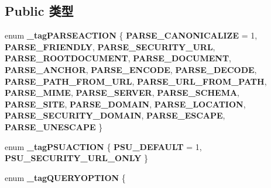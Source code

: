 \subsection*{Public 类型}
\begin{DoxyCompactItemize}
\item 
\mbox{\label{interface_i_internet_protocol_info_a3e2540984d5743ca6453922a83fffb62}} 
enum {\bfseries \+\_\+tag\+P\+A\+R\+S\+E\+A\+C\+T\+I\+ON} \{ \newline
{\bfseries P\+A\+R\+S\+E\+\_\+\+C\+A\+N\+O\+N\+I\+C\+A\+L\+I\+ZE} = 1, 
{\bfseries P\+A\+R\+S\+E\+\_\+\+F\+R\+I\+E\+N\+D\+LY}, 
{\bfseries P\+A\+R\+S\+E\+\_\+\+S\+E\+C\+U\+R\+I\+T\+Y\+\_\+\+U\+RL}, 
{\bfseries P\+A\+R\+S\+E\+\_\+\+R\+O\+O\+T\+D\+O\+C\+U\+M\+E\+NT}, 
\newline
{\bfseries P\+A\+R\+S\+E\+\_\+\+D\+O\+C\+U\+M\+E\+NT}, 
{\bfseries P\+A\+R\+S\+E\+\_\+\+A\+N\+C\+H\+OR}, 
{\bfseries P\+A\+R\+S\+E\+\_\+\+E\+N\+C\+O\+DE}, 
{\bfseries P\+A\+R\+S\+E\+\_\+\+D\+E\+C\+O\+DE}, 
\newline
{\bfseries P\+A\+R\+S\+E\+\_\+\+P\+A\+T\+H\+\_\+\+F\+R\+O\+M\+\_\+\+U\+RL}, 
{\bfseries P\+A\+R\+S\+E\+\_\+\+U\+R\+L\+\_\+\+F\+R\+O\+M\+\_\+\+P\+A\+TH}, 
{\bfseries P\+A\+R\+S\+E\+\_\+\+M\+I\+ME}, 
{\bfseries P\+A\+R\+S\+E\+\_\+\+S\+E\+R\+V\+ER}, 
\newline
{\bfseries P\+A\+R\+S\+E\+\_\+\+S\+C\+H\+E\+MA}, 
{\bfseries P\+A\+R\+S\+E\+\_\+\+S\+I\+TE}, 
{\bfseries P\+A\+R\+S\+E\+\_\+\+D\+O\+M\+A\+IN}, 
{\bfseries P\+A\+R\+S\+E\+\_\+\+L\+O\+C\+A\+T\+I\+ON}, 
\newline
{\bfseries P\+A\+R\+S\+E\+\_\+\+S\+E\+C\+U\+R\+I\+T\+Y\+\_\+\+D\+O\+M\+A\+IN}, 
{\bfseries P\+A\+R\+S\+E\+\_\+\+E\+S\+C\+A\+PE}, 
{\bfseries P\+A\+R\+S\+E\+\_\+\+U\+N\+E\+S\+C\+A\+PE}
 \}
\item 
\mbox{\label{interface_i_internet_protocol_info_a9ba7919b01c2c81c8aae87d78623bf45}} 
enum {\bfseries \+\_\+tag\+P\+S\+U\+A\+C\+T\+I\+ON} \{ {\bfseries P\+S\+U\+\_\+\+D\+E\+F\+A\+U\+LT} = 1, 
{\bfseries P\+S\+U\+\_\+\+S\+E\+C\+U\+R\+I\+T\+Y\+\_\+\+U\+R\+L\+\_\+\+O\+N\+LY}
 \}
\item 
\mbox{\label{interface_i_internet_protocol_info_a9083fb49796ac53cfdcf9aebaa5adcad}} 
enum {\bfseries \+\_\+tag\+Q\+U\+E\+R\+Y\+O\+P\+T\+I\+ON} \{ \newline

\end{DoxyCompactItemize}
